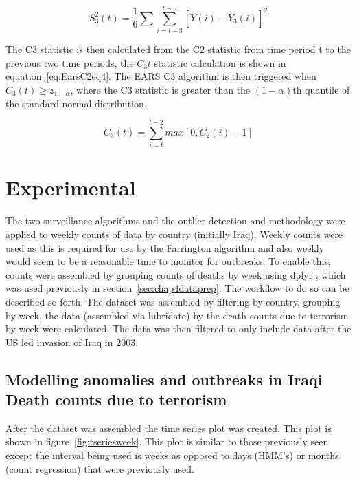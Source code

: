 \begin{equation} 
S^{2}_{3}(t)=\frac{1}{6}\sum \sum_{i=t-3}^{t-9}[Y(i)-\hat{Y}_{3}(i)]^{2}
\label{eq:EarsC2eq3}  \end{equation}

The C3 statistic is then calculated from the C2 statistic from time period t to the previous two time periods, the $C_{3}t$ statistic calculation is shown in equation~\ref{eq:EarsC2eq4}. The EARS C3 algorithm is then triggered when $C_3(t) \geq z_{1-\alpha}$, where the C3 statistic is greater than the $(1-\alpha)$th quantile of the standard normal distribution.

\begin{equation} 
C_{3}(t)=\sum_{i=t}^{t-2}max[0,C_{2}(i)-1]
\label{eq:EarsC2eq4}  \end{equation}

\section{Experimental}
The two surveillance algorithms and the outlier detection and methodology were applied to weekly counts of data by country (initially Iraq). Weekly counts were used as this is required for use by the Farrington algorithm and also weekly would seem to be a reasonable time to monitor for outbreaks. To enable this, counts were assembled by grouping counts of deaths by week using dplyr \citep{wickham2015dplyr}, which was used previously in section~\ref{sec:chap4dataprep}. The workflow to do so can be described so forth. The dataset was assembled by filtering by country, grouping by week, the data (assembled via lubridate) by \citep{grolemund2011dates} the death counts due to terrorism by week were calculated. The data was then filtered to only include data after the US led invasion of Iraq in 2003.

\subsection{Modelling anomalies and outbreaks in Iraqi Death counts due to terrorism}

After the dataset was assembled the time series plot was created. This plot is shown in figure~\ref{fig:tseriesweek}. This plot is similar to those previously seen except the interval being used is weeks as opposed to days (HMM's) or months (count regression) that were previously used.

